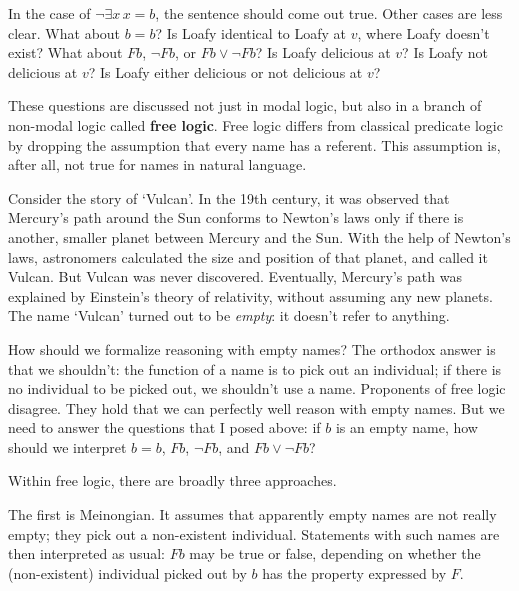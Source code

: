 In the case of $\neg \exists x\, x\!=\!b$, the sentence should come out true.
Other cases are less clear. What about $b\!=\!b$? Is Loafy identical to Loafy at
$v$, where Loafy doesn't exist? What about $Fb$, $\neg Fb$, or
$Fb \lor \neg Fb$? Is Loafy delicious at $v$? Is Loafy not delicious at $v$? Is
Loafy either delicious or not delicious at $v$?

These questions are discussed not just in modal logic, but also in a branch of
non-modal logic called \textbf{free logic}. Free logic differs from classical
predicate logic by dropping the assumption that every name has a referent. This
assumption is, after all, not true for names in natural language.

Consider the story of `Vulcan'. In the 19th century, it was observed that
Mercury's path around the Sun conforms to Newton's laws only if there is
another, smaller planet between Mercury and the Sun. With the help of Newton's
laws, astronomers calculated the size and position of that planet, and called it
Vulcan. But Vulcan was never discovered. Eventually, Mercury's path was
explained by Einstein's theory of relativity, without assuming any new planets.
The name `Vulcan' turned out to be \emph{empty}: it doesn't refer to anything.


How should we formalize reasoning with empty names? The orthodox answer is that
we shouldn't: the function of a name is to pick out an individual; if there is
no individual to be picked out, we shouldn't use a name. Proponents of free
logic disagree. They hold that we can perfectly well reason with empty names. But we
need to answer the questions that I posed above: if $b$ is an empty
name, how should we interpret $b=b$, $Fb$, $\neg Fb$, and $Fb \lor \neg Fb$?

Within free logic, there are broadly three approaches.

The first is Meinongian. It assumes that apparently empty names are not really
empty; they pick out a non-existent individual. Statements with
such names are then interpreted as usual: $Fb$ may be true or false, depending
on whether the (non-existent) individual picked out by $b$ has the property
expressed by $F$.

